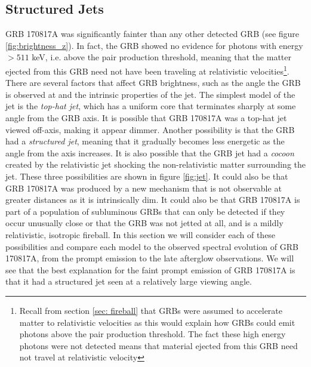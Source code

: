 \documentclass[11pt]{cuthesis}
\begin{document}
\subsection{Structured Jets}
GRB 170817A was significantly fainter than any other detected GRB (see figure \ref{fig:brightness_z}). In fact, the GRB showed no evidence for photons with energy $>511$ keV, i.e. above the pair production threshold, meaning that the matter ejected from this GRB need not have been traveling at relativistic velocities\footnote{Recall from section \ref{sec: fireball} that GRBs were assumed to accelerate matter to relativistic velocities as this would explain how GRBs could emit photons above the pair production threshold. The fact these high energy photons were not detected means that material ejected from this GRB need not travel at relativistic velocity}. There are several factors that affect GRB brightness, such as the angle the GRB is observed at and the intrinsic properties of the jet. The simplest model of the jet is the \textit{top-hat jet}, which has a uniform core that terminates sharply at some angle from the GRB axis. It is possible that GRB 170817A was a top-hat jet viewed off-axis, making it appear dimmer. Another possibility is that the GRB had a \textit{structured jet}, meaning that it gradually becomes less energetic as the angle from the axis increases. It is also possible that the GRB jet had a \textit{cocoon} created by the relativistic jet shocking the non-relativistic matter surrounding the jet. These three possibilities are shown in figure \ref{fig:jet}. It could also be that GRB 170817A was produced by a new mechanism that is not observable at greater distances as it is intrinsically dim. It could also be that GRB 170817A is part of a population of subluminous GRBs that can only be detected if they occur unusually close or that the GRB was not jetted at all, and is a mildly relativistic, isotropic fireball. In this section we will consider each of these possibilities and compare each model to the observed spectral evolution of GRB 170817A, from the prompt emission to the late afterglow observations. We will see that the best explanation for the faint prompt emission of GRB 170817A is that it had a structured jet seen at a relatively large viewing angle. 
\end{document}
